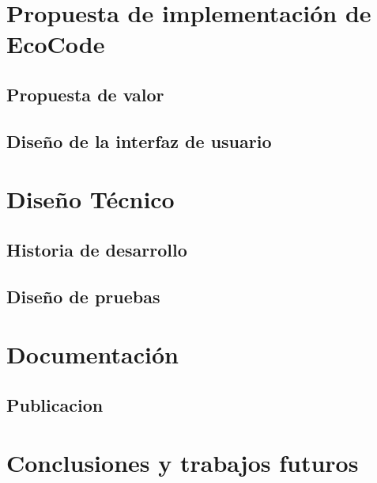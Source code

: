 \documentclass[12pt,a4paper]{report}
\begin{document}
\chapter{Propuesta de implementación de EcoCode}

\section{Propuesta de valor}

\section{Diseño de la interfaz de usuario}

\chapter{Diseño Técnico}

\section{Historia de desarrollo}

\section{Diseño de pruebas}

\chapter{Documentación}

\section{Publicacion}

\chapter{Conclusiones y trabajos futuros}

\end{document}
